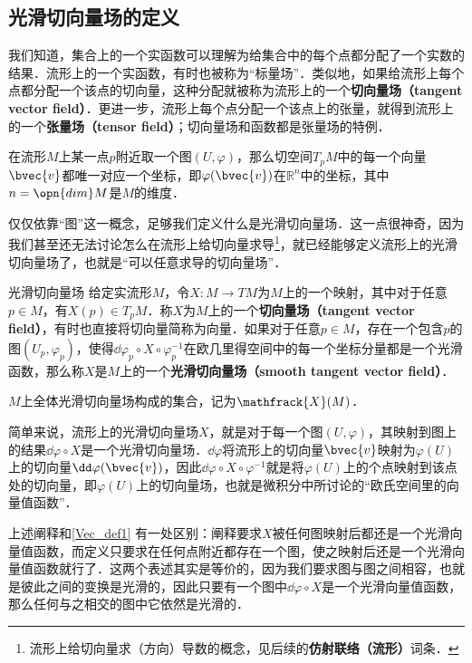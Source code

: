 
\subsection{光滑切向量场的定义}

我们知道，集合上的一个实函数可以理解为给集合中的每个点都分配了一个实数的结果．流形上的一个实函数，有时也被称为“标量场”．类似地，如果给流形上每个点都分配一个该点的切向量，这种分配就被称为流形上的一个\textbf{切向量场（tangent vector field）}．更进一步，流形上每个点分配一个该点上的张量，就得到流形上的一个\textbf{张量场（tensor field）}；切向量场和函数都是张量场的特例．


在流形$M$上某一点$p$附近取一个图$(U, \varphi)$，那么切空间$T_pM$中的每一个向量$\bvec{v}$都唯一对应一个坐标，即$\varphi(\bvec{v})$在$\mathbb{R}^n$中的坐标，其中$n=\opn{dim}M$是$M$的维度．

仅仅依靠“图”这一概念，足够我们定义什么是光滑切向量场．这一点很神奇，因为我们甚至还无法讨论怎么在流形上给切向量求导\footnote{流形上给切向量求（方向）导数的概念，见后续的\textbf{仿射联络（流形）}词条．}，就已经能够定义流形上的光滑切向量场了，也就是“可以任意求导的切向量场”．

\begin{definition}{光滑切向量场}\label{Vec_def1}
给定实流形$M$，令$X:M\to TM$为$M$上的一个映射，其中对于任意$p\in M$，有$X(p)\in T_pM$．称$X$为$M$上的一个\textbf{切向量场（tangent vector field）}，有时也直接将切向量简称为向量．如果对于任意$p\in M$，存在一个包含$p$的图$(U_p, \varphi_p)$，使得$\dd\varphi_p\circ X\circ\varphi_p^{-1}$在欧几里得空间中的每一个坐标分量都是一个光滑函数，那么称$X$是$M$上的一个\textbf{光滑切向量场（smooth tangent vector field）}．

$M$上全体光滑切向量场构成的集合，记为$\mathfrack{X}(M)$．
\end{definition}

简单来说，流形上的光滑切向量场$X$，就是对于每一个图$(U, \varphi)$，其映射到图上的结果$\dd\varphi\circ X$是一个光滑切向量场．$\dd\varphi$将流形上的切向量$\bvec{v}$映射为$\varphi(U)$上的切向量$\dd\varphi(\bvec{v})$，因此$\dd\varphi\circ X\circ\varphi^{-1}$就是将$\varphi(U)$上的个点映射到该点处的切向量，即$\varphi(U)$上的切向量场，也就是微积分中所讨论的“欧氏空间里的向量值函数”．

上述阐释和\autoref{Vec_def1} 有一处区别：阐释要求$X$被任何图映射后都还是一个光滑向量值函数，而定义只要求在任何点附近都存在一个图，使之映射后还是一个光滑向量值函数就行了．这两个表述其实是等价的，因为我们要求图与图之间相容，也就是彼此之间的变换是光滑的，因此只要有一个图中$\dd\varphi\circ X$是一个光滑向量值函数，那么任何与之相交的图中它依然是光滑的．

